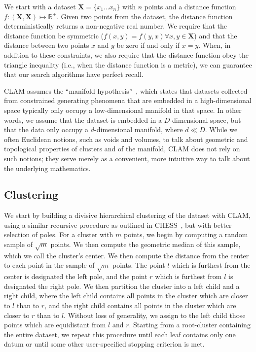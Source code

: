We start with a dataset $\textbf{X} = \{x_1 \dots x_n\}$ with $n$ points and a distance function $f : (\textbf{X}, \textbf{X}) \mapsto \mathbb{R}^+$.
Given two points from the dataset, the distance function deterministically returns a non-negative real number. We require that the distance function be symmetric ($f(x, y) = f(y, x) \forall x, y \in \textbf{X}$) and 
that the distance between two points $x$ and $y$ be zero if and only if $x = y$. When, in addition to these constraints, we also require that the distance function obey 
the triangle inequality (i.e., when the distance function is a metric), we can guarantee that our search algorithms have perfect recall. 

CLAM assumes the ``manifold hypothesis''~\cite{fefferman2016testing}, which states that datasets collected from constrained generating phenomena that are embedded in a high-dimensional space typically only occupy a low-dimensional manifold in that space.
In other words, we assume that the dataset is embedded in a $D$-dimensional space, but that the data only occupy a $d$-dimensional manifold, where $d \ll D$. While we often Euclidean notions, such as voids and volumes, to talk about geometric and topological 
properties of clusters and of the manifold, CLAM does not rely on such notions; they serve merely as a convenient, more intuitive way to talk about the underlying mathematics.

\subsection{Clustering}
\label{subsec:methods:clustering}

We start by building a divisive hierarchical clustering of the dataset with CLAM, using a 
similar recursive procedure as outlined in CHESS~\cite{ishaq2019clustered}, but with better selection of 
poles. For a cluster with $m$ points, we begin by computing a 
random sample of $\sqrt m$ points. We then compute the geometric median of this sample, which we call the 
cluster's center. We then compute the distance from the center to each point in the sample of $\sqrt m$ points. 
The point $l$ which is furthest from the center is designated the left pole, and the point $r$ which is furthest
from $l$ is designated the right pole. We then partition the cluster into a left child and a right child, where the 
left child contains all points in the cluster which are closer to $l$ than to $r$, and the right child contains all 
points in the cluster which are closer to $r$ than to $l$. Without loss of generality, we assign to the left child 
those points which are equidistant from $l$ and $r$. Starting from a root-cluster containing the entire dataset, we 
repeat this procedure until each leaf contains only one datum or until some other user-specified stopping criterion 
is met.


